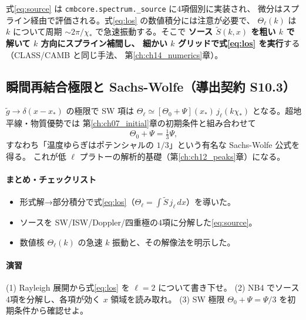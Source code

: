 \begin{numreality}
式\eqref{eq:source} は \texttt{cmbcore.spectrum.\_source} に4項個別に実装され、
微分はスプライン経由で評価される。式\eqref{eq:los} の数値積分には注意が必要で、
$\Theta_\ell(k)$ は $k$ について周期 $\sim2\pi/\chi_*$ で急速振動する。そこで
\textbf{ソース $\tilde S(k,x)$ を粗い $k$ で解いて $k$ 方向にスプライン補間し、
細かい $k$ グリッドで式\eqref{eq:los} を実行}する（CLASS/CAMB と同じ手法、
第\ref{ch:ch14_numerics}章）。
\end{numreality}

\subsection{瞬間再結合極限と Sachs-Wolfe（導出契約 S10.3）}
$\tilde g\to\delta(x-x_*)$ の極限で SW 項は
$\Theta_\ell\simeq[\Theta_0+\Psi](x_*)\,j_\ell(k\chi_*)$ となる。超地平線・物質優勢では
第\ref{ch:ch07_initial}章の初期条件と組み合わせて
\begin{equation}
  \Theta_0+\Psi=\tfrac13\Psi,
\end{equation}
すなわち「温度ゆらぎはポテンシャルの $1/3$」という有名な Sachs-Wolfe 公式を得る。
これが低 $\ell$ プラトーの解析的基礎（第\ref{ch:ch12_peaks}章）になる。

\paragraph{まとめ・チェックリスト}
\begin{itemize}
  \item 形式解→部分積分で式\eqref{eq:los}（$\Theta_\ell=\int\tilde S\,j_\ell\,dx$）を導いた。
  \item ソースを SW/ISW/Doppler/四重極の4項に分解した\eqref{eq:source}。
  \item 数値核 $\Theta_\ell(k)$ の急速 $k$ 振動と、その解像法を明示した。
\end{itemize}

\paragraph{演習}
(1) Rayleigh 展開から式\eqref{eq:los} を $\ell=2$ について書き下せ。
(2) NB4 でソース4項を分解し、各項が効く $x$ 領域を読み取れ。
(3) SW 極限 $\Theta_0+\Psi=\Psi/3$ を初期条件から確認せよ。

